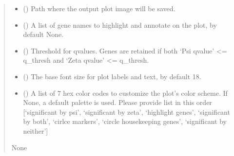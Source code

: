 \documentclass[letterpaper,10pt,english]{sphinxmanual}
\begin{document}
\begin{fulllineitems}
\begin{quote}
\begin{description}
\begin{itemize}
\item {} 
\sphinxAtStartPar
{} (\sphinxstyleliteralemphasis{\sphinxupquote{, }}) \textendash{} Path where the output plot image will be saved.

\item {} 
\sphinxAtStartPar
{} (\sphinxstyleliteralemphasis{\sphinxupquote{{[}}}\sphinxstyleliteralemphasis{\sphinxupquote{{]}}}\sphinxstyleliteralemphasis{\sphinxupquote{, }}) \textendash{} A list of gene names to highlight and annotate on the plot, by default None.

\item {} 
\sphinxAtStartPar
{} (\sphinxstyleliteralemphasis{\sphinxupquote{, }}\sphinxstyleliteralemphasis{\sphinxupquote{, }}) \textendash{} Threshold for q\sphinxhyphen{}values. Genes are retained if both
‘Psi q\sphinxhyphen{}value’ \textless{}= q\_thresh and ‘Zeta q\sphinxhyphen{}value’ \textless{}= q\_thresh.

\item {} 
\sphinxAtStartPar
{} (\sphinxstyleliteralemphasis{\sphinxupquote{, }}) \textendash{} The base font size for plot labels and text, by default 18.

\item {} 
\sphinxAtStartPar
{} (\sphinxstyleliteralemphasis{\sphinxupquote{{[}}}\sphinxstyleliteralemphasis{\sphinxupquote{{]}}}\sphinxstyleliteralemphasis{\sphinxupquote{, }}) \textendash{} A list of 7 hex color codes to customize the plot’s color scheme.
If None, a default palette is used.
Please provide list in this order
{[}‘significant by psi’,
‘significant by zeta’,
‘highlight genes’,
‘significant by both’,
‘cirlce markers’,
‘circle housekeeping genes’,
‘significant by neither’{]}

\end{itemize}

\sphinxAtStartPar
None

\end{description}\end{quote}

\end{fulllineitems}
\end{document}
